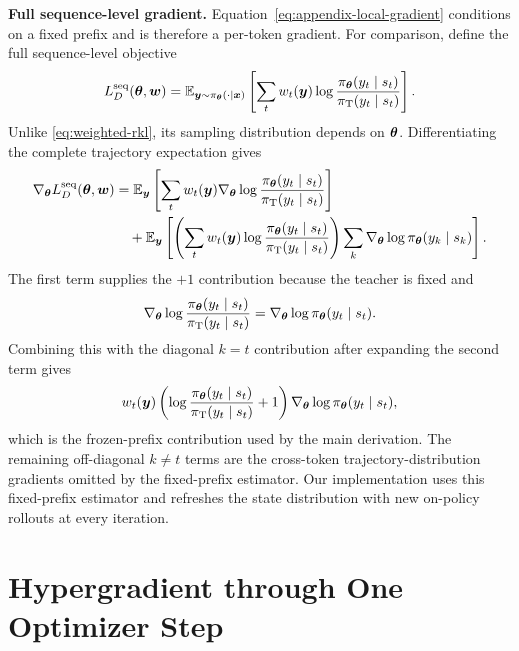 \documentclass{article} %
\begin{document}
\noindent\textbf{Full sequence-level gradient.}\enspace
Equation~\eqref{eq:appendix-local-gradient} conditions on a fixed prefix and is
therefore a per-token gradient. For comparison, define the full sequence-level
objective
\[
    L_D^{\mathrm{seq}}(\bm{\theta},\bm{w})
    =\mathbb E_{\bm{y}\sim\pi_{\bm{\theta}}(\cdot\mid\bm{x})}
    \left[
        \sum_t w_t(\bm{y})
        \log\frac{\pi_{\bm{\theta}}(y_t\mid s_t)}
                  {\pi_{\mathrm T}(y_t\mid s_t)}
    \right].
\]
Unlike \cref{eq:weighted-rkl}, its sampling distribution depends on
\(\bm{\theta}\). Differentiating the complete trajectory expectation gives
\begin{align*}
    \nabla_{\bm{\theta}}
    L_D^{\mathrm{seq}}(\bm{\theta},\bm{w})
    &=
    \mathbb E_{\bm{y}}\left[
        \sum_t w_t(\bm{y})
        \nabla_{\bm{\theta}}
        \log
        \frac{\pi_{\bm{\theta}}(y_t\mid s_t)}
             {\pi_{\mathrm{T}}(y_t\mid s_t)}
    \right]
    \\
    &\quad+
    \mathbb E_{\bm{y}}\left[
        \left(
            \sum_t w_t(\bm{y})
            \log
            \frac{\pi_{\bm{\theta}}(y_t\mid s_t)}
                 {\pi_{\mathrm{T}}(y_t\mid s_t)}
        \right)
        \sum_k\nabla_{\bm{\theta}}\log\pi_{\bm{\theta}}(y_k\mid s_k)
    \right].
\end{align*}
The first term supplies the \(+1\) contribution because the teacher is fixed
and
\[
\nabla_{\bm{\theta}}
\log
\frac{\pi_{\bm{\theta}}(y_t\mid s_t)}
     {\pi_{\mathrm{T}}(y_t\mid s_t)}
=\nabla_{\bm{\theta}}\log\pi_{\bm{\theta}}(y_t\mid s_t).
\]
Combining this with the
diagonal \(k=t\) contribution after expanding the second term gives
\[
    w_t(\bm{y})
    \left(
        \log
        \frac{\pi_{\bm{\theta}}(y_t\mid s_t)}
             {\pi_{\mathrm{T}}(y_t\mid s_t)}
        +1
    \right)
    \nabla_{\bm{\theta}}\log\pi_{\bm{\theta}}(y_t\mid s_t),
\]
which is the frozen-prefix contribution used by the main derivation. The
remaining off-diagonal \(k\ne t\) terms are the cross-token
trajectory-distribution gradients omitted by the fixed-prefix estimator.
Our implementation uses this fixed-prefix estimator and refreshes the state
distribution with new on-policy rollouts at every iteration.

\section{Hypergradient through One Optimizer Step}
\label{app:optimizer-hypergradient}
\end{document}
